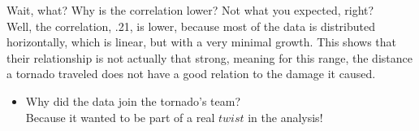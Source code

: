 \documentclass[
]{article}
\providecommand{\tightlist}{%
  \setlength{\itemsep}{0pt}\setlength{\parskip}{0pt}}
\begin{document}
Wait, what? Why is the correlation lower? Not what you expected,
right?\\
Well, the correlation, .21, is lower, because most of the data is
distributed horizontally, which is linear, but with a very minimal
growth. This shows that their relationship is not actually that strong,
meaning for this range, the distance a tornado traveled does not have a
good relation to the damage it caused.

\begin{itemize}
\tightlist
\item
  Why did the data join the tornado's team?\\
  Because it wanted to be part of a real \(twist\) in the analysis!
\end{itemize}
\end{document}
